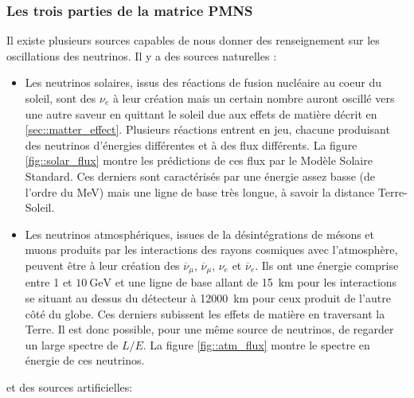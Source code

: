             \subsubsection{Les trois parties de la matrice PMNS}
            Il existe plusieurs sources capables de nous donner des renseignement sur les oscillations des neutrinos. Il y a des sources naturelles :
            \begin{itemize}
                \item Les neutrinos solaires, issus des réactions de fusion nucléaire au coeur du soleil, sont des $\nu_e$ à leur création mais un certain nombre auront oscillé vers une autre saveur en quittant le soleil due aux effets de matière décrit en \autoref{sec::matter_effect}. Plusieurs réactions entrent en jeu, chacune produisant des neutrinos d'énergies différentes et à des flux différents. La figure \autoref{fig::solar_flux} montre les prédictions de ces flux par le Modèle Solaire Standard\cite{Haxton2013}. Ces derniers sont caractérisés par une énergie assez basse (de l'ordre du \si{\mega\electronvolt}) mais une ligne de base très longue, à savoir la distance Terre-Soleil.
                \item Les neutrinos atmosphériques, issues de la désintégrations de mésons et muons produits par les interactions des rayons cosmiques avec l'atmosphère, peuvent être à leur création des $\overline{\nu}_{\mu}$, $\overline{\nu}_{\mu}$, $\nu_e$ et $\overline{\nu}_e$. Ils ont une énergie comprise entre 1 et $\SI{10}{\giga\electronvolt}$ et une ligne de base allant de \SI{15}{\kilo\meter} pour les interactions se situant au dessus du détecteur à \SI{12000}{\kilo\meter} pour ceux produit de l'autre côté du globe. Ces derniers subissent les effets de matière en traversant la Terre. Il est donc possible, pour une même source de neutrinos, de regarder un large spectre de $L/E$. La figure \autoref{fig::atm_flux} montre le spectre en énergie de ces neutrinos.
            \end{itemize}
            et des sources artificielles:
